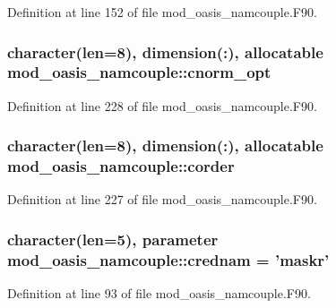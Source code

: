 Definition at line 152 of file mod\+\_\+oasis\+\_\+namcouple.\+F90.

\hypertarget{classmod__oasis__namcouple_a205e8ba5863c6bf6de5c8450fb060c7a}{
\subsubsection[{cnorm\+\_\+opt}]{\setlength{\rightskip}{0pt plus 5cm}character(len=8), dimension(\+:), allocatable mod\+\_\+oasis\+\_\+namcouple\+::cnorm\+\_\+opt\hspace{0.3cm}{\ttfamily [private]}}}\label{classmod__oasis__namcouple_a205e8ba5863c6bf6de5c8450fb060c7a}


Definition at line 228 of file mod\+\_\+oasis\+\_\+namcouple.\+F90.

\hypertarget{classmod__oasis__namcouple_a070f65b97986d1075f1deed9224cd89b}{
\subsubsection[{corder}]{\setlength{\rightskip}{0pt plus 5cm}character(len=8), dimension(\+:), allocatable mod\+\_\+oasis\+\_\+namcouple\+::corder\hspace{0.3cm}{\ttfamily [private]}}}\label{classmod__oasis__namcouple_a070f65b97986d1075f1deed9224cd89b}


Definition at line 227 of file mod\+\_\+oasis\+\_\+namcouple.\+F90.

\hypertarget{classmod__oasis__namcouple_a161fc23acf442c75c9d6ba7758937d59}{
\subsubsection[{crednam}]{\setlength{\rightskip}{0pt plus 5cm}character(len=5), parameter mod\+\_\+oasis\+\_\+namcouple\+::crednam = 'maskr'\hspace{0.3cm}{\ttfamily [private]}}}\label{classmod__oasis__namcouple_a161fc23acf442c75c9d6ba7758937d59}


Definition at line 93 of file mod\+\_\+oasis\+\_\+namcouple.\+F90.

